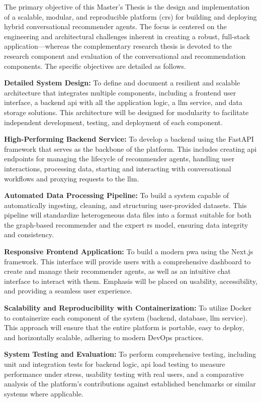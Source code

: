 The primary objective of this Master's Thesis is the design and implementation of a scalable, modular, and reproducible platform (\acl{crs}) for building and deploying hybrid conversational recommender agents. The focus is centered on the engineering and architectural challenges inherent in creating a robust, full-stack application---whereas the complementary research thesis \cite{MUI2ICSI-THESIS} is devoted to the research component and evaluation of the conversational and recommendation components. The specific objectives are detailed as follows.

\begin{objetive}
    \item \textbf{Detailed System Design:} To define and document a resilient and scalable architecture that integrates multiple components, including a frontend user interface, a backend \acs{api} with all the application logic, a \ac{llm} service, and data storage solutions. This architecture will be designed for modularity to facilitate independent development, testing, and deployment of each component.

    \item \textbf{High-Performing Backend Service:} To develop a backend using the FastAPI framework that serves as the backbone of the platform. This includes creating \acs{api} endpoints for managing the lifecycle of recommender agents, handling user interactions, processing data, starting and interacting with conversational workflows and proxying requests to the \ac{llm}.

    \item \textbf{Automated Data Processing Pipeline:} To build a system capable of automatically ingesting, cleaning, and structuring user-provided datasets. This pipeline will standardize heterogeneous data files into a format suitable for both the graph-based recommender and the expert \acs{rs} model, ensuring data integrity and consistency.

    \item \textbf{Responsive Frontend Application:} To build a modern \ac{pwa} using the Next.js framework. This interface will provide users with a comprehensive dashboard to create and manage their recommender agents, as well as an intuitive chat interface to interact with them. Emphasis will be placed on usability, accessibility, and providing a seamless user experience.

    \item \textbf{Scalability and Reproducibility with Containerization:} To utilize Docker to containerize each component of the system (backend, database, \ac{llm} service). This approach will ensure that the entire platform is portable, easy to deploy, and horizontally scalable, adhering to modern DevOps practices.

    \item \textbf{System Testing and Evaluation:} To perform comprehensive testing, including unit and integration tests for backend logic, \acs{api} load testing to measure performance under stress, usability testing with real users, and a comparative analysis of the platform's contributions against established benchmarks or similar systems where applicable.
\end{objetive}
